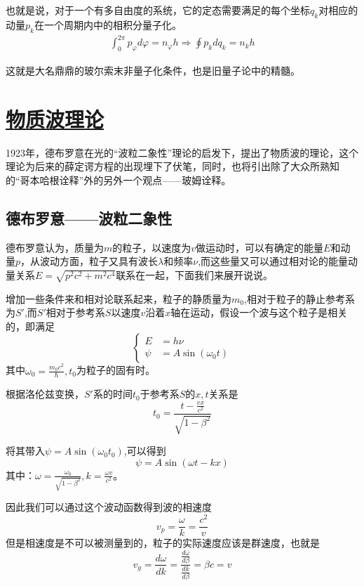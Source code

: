 \documentclass{article}
\newcommand{\ds}{\displaystyle}
\begin{document}
也就是说，对于一个有多自由度的系统，它的定态需要满足的每个坐标$q_k$对相应的动量$p_k$在一个周期内中的相积分量子化。
\begin{align*}
	\int_0^{2\pi}p_\varphi d\varphi =n_\varphi h
	\Rightarrow \oint p_kdq_k = n_k h
\end{align*}

这就是大名鼎鼎的玻尔索末非量子化条件，也是旧量子论中的精髓。




\section{\protect\hyperlink{:}{物质波理论}}
1923年，德布罗意在光的“波粒二象性”理论的启发下，提出了物质波的理论，这个理论为后来的薛定谔方程的出现埋下了伏笔，同时，也将引出除了大众所熟知的“哥本哈根诠释”外的另外一个观点——玻姆诠释。

\subsection{德布罗意——波粒二象性}

德布罗意认为，质量为$m$的粒子，以速度为$v$做运动时，可以有确定的能量$E$和动量$p$，从波动方面，粒子又具有波长$\lambda$和频率$\nu$,而这些量又可以通过相对论的能量动量关系$\ds{E=\sqrt{p^2c^2+m^2c^4}}$联系在一起，下面我们来展开说说。

增加一些条件来和相对论联系起来，粒子的静质量为$m_0$,相对于粒子的静止参考系为$S'$,而$S'$相对于参考系$S$以速度$v$沿着$x$轴在运动，假设一个波与这个粒子是相关的，即满足
\begin{equation*}
	\begin{cases}
		E    & =h\nu             \\
		\psi & =A\sin(\omega_0t)
	\end{cases}
\end{equation*}
其中$\ds\omega_0=\frac{m_0c^2}{\hbar},t_0$为粒子的固有时。

根据洛伦兹变换，$S'$系的时间$t_0$于参考系$S$的$x,t$关系是
\[t_0=\frac{t-\frac{vx}{c^2}}{\sqrt{1-\beta^2}}\]

将其带入$\psi=A\sin(\omega_0t_0)$,可以得到
\[\psi = A\sin(\omega t-kx)\]
其中：$\omega = \frac{\omega_0}{\sqrt{1-\beta^2}},k=\frac{\omega v}{c^2}$。

因此我们可以通过这个波动函数得到波的相速度
\[v_p=\frac{\omega}{k}=\frac{c^2}{v}\]
但是相速度是不可以被测量到的，粒子的实际速度应该是群速度，也就是
\[v_g=\frac{d\omega}{dk}=\frac{\frac{d\omega}{d\beta}}{\frac{dk}{d\beta}}=\beta c=v\]
\end{document}

